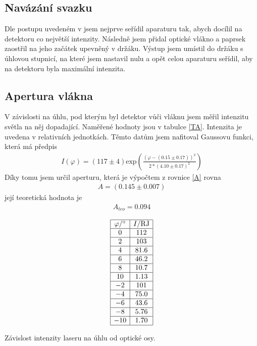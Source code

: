 \documentclass[a4paper,12pt]{article}
\begin{document}
\subsection{Navázání svazku}
Dle postupu uvedeném v \cite{text} jsem nejprve seřídil aparaturu tak, abych docílil na detektoru co největší intenzity. 
Následně jsem přidal optické vlákno a paprsek zaostřil na jeho začátek upevněný v držáku. Výstup jsem umístil do držáku s úhlovou stupnicí, 
na které jsem nastavil nulu a opět celou aparaturu seřídil, aby na detektoru byla maximální intenzita.

\subsection{Apertura vlákna}
V závislosti na úhlu, pod kterým byl detektor vůči vláknu jsem měřil intenzitu světla na něj dopadající. Naměřené hodnoty jsou v tabulce \ref{TA}. Intenzita je uvedena v relativních jednotkách. Těmto datům jsem nafitoval Gaussovu funkci, která má předpis
\begin{eqnarray}
I(\varphi)=(117 \pm 4)\mbox{exp}\left(\frac{(\varphi-(0.15\pm0.17))^2}{2*(4.10\pm0.17)^2}\right)
\end{eqnarray}
Díky tomu jsem určil aperturu, která je výpočtem z rovnice \ref{A} rovna
\begin{eqnarray}
A=(0.145 \pm 0.007)
\end{eqnarray}
její teoretická hodnota je
\begin{eqnarray}
A_{teo}=0.094
\end{eqnarray}

\begin{table}
$$
\begin{array}{|c|c|}
\hline
\varphi/^{\circ}&    I/\mbox{RJ} \\ \hline
0&  112 \\ \hline
2&  103 \\ \hline
4&  81.6 \\ \hline
6&  46.2 \\ \hline
8&  10.7 \\ \hline
10& 1.13 \\ \hline
-2& 101 \\ \hline
-4& 75.0 \\ \hline
-6& 43.6 \\ \hline
-8& 5.76 \\ \hline
-10&    1.70 \\ \hline
\end{array}
$$
\caption{Závislost intenzity laseru na úhlu od optické osy.}
\label{TA}
\end{table}
\end{document}

